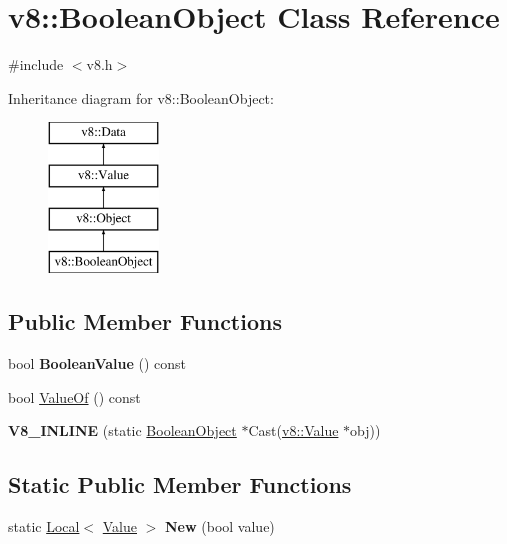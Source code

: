 \hypertarget{classv8_1_1_boolean_object}{}\section{v8\+:\+:Boolean\+Object Class Reference}
\label{classv8_1_1_boolean_object}


{\ttfamily \#include $<$v8.\+h$>$}

Inheritance diagram for v8\+:\+:Boolean\+Object\+:\begin{figure}[H]
\begin{center}
\leavevmode
\includegraphics[height=4.000000cm]{classv8_1_1_boolean_object}
\end{center}
\end{figure}
\subsection*{Public Member Functions}
\begin{DoxyCompactItemize}
\item 
\hypertarget{classv8_1_1_boolean_object_a646051d57e93ba1df2ce6c93eef5aec9}{}bool {\bfseries Boolean\+Value} () const \label{classv8_1_1_boolean_object_a646051d57e93ba1df2ce6c93eef5aec9}

\item 
bool \hyperlink{classv8_1_1_boolean_object_a283419656e641bcd9588dee56c0a0686}{Value\+Of} () const 
\item 
\hypertarget{classv8_1_1_boolean_object_a4cee7bf0cbca6368e052d79b613fc6cb}{}{\bfseries V8\+\_\+\+I\+N\+L\+I\+N\+E} (static \hyperlink{classv8_1_1_boolean_object}{Boolean\+Object} $\ast$Cast(\hyperlink{classv8_1_1_value}{v8\+::\+Value} $\ast$obj))\label{classv8_1_1_boolean_object_a4cee7bf0cbca6368e052d79b613fc6cb}

\end{DoxyCompactItemize}
\subsection*{Static Public Member Functions}
\begin{DoxyCompactItemize}
\item 
\hypertarget{classv8_1_1_boolean_object_af57ca9198a6c6d00617da80b3f705e37}{}static \hyperlink{classv8_1_1_local}{Local}$<$ \hyperlink{classv8_1_1_value}{Value} $>$ {\bfseries New} (bool value)\label{classv8_1_1_boolean_object_af57ca9198a6c6d00617da80b3f705e37}

\end{DoxyCompactItemize}



